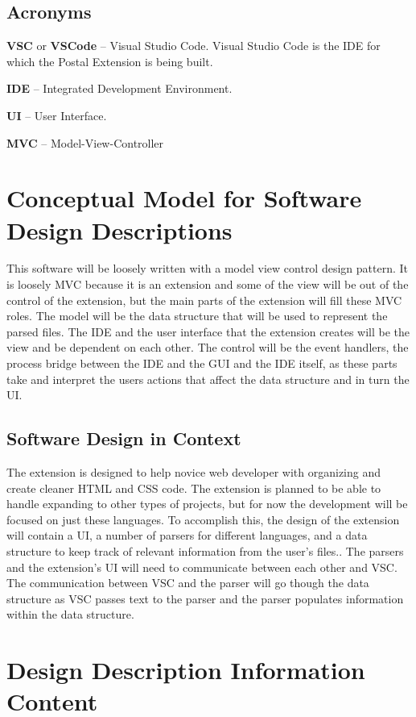 \documentclass[letterpaper,10pt,titlepage,draftclsnofoot,onecolumn,onesided] {IEEEtran}
\begin{document}
\subsection{Acronyms}
\textbf{VSC} or \textbf{VSCode} -- Visual Studio Code. Visual Studio Code is the IDE for which the Postal Extension is being built. 

\textbf{IDE} -- Integrated Development Environment. 

\textbf{UI} -- User Interface. 

\textbf{MVC} -- Model-View-Controller


\section{Conceptual Model for Software Design Descriptions}
This software will be loosely written with a model view control design pattern.
It is loosely MVC because it is an extension and some of the view will be out of the control of the extension, but the main parts of the extension will fill these MVC roles.
The model will be the data structure that will be used to represent the parsed files. 
The IDE and the user interface that the extension creates will be the view and be dependent on each other.
The control will be the event handlers, the process bridge between the IDE and the GUI and the IDE itself, as these parts take and interpret the users actions that affect the data structure and in turn the UI.

\subsection{Software Design in Context}
The extension is designed to help novice web developer with organizing and create cleaner HTML and CSS code. 
The extension is planned to be able to handle expanding to other types of projects, but for now the development will be focused on just these languages. 
To accomplish this, the design of the extension will contain a UI, a number of parsers for different languages, and a data structure to keep track of relevant information from the user's files..
The parsers and the extension's UI will need to communicate between each other and VSC.
The communication between VSC and the parser will go though the data structure as VSC passes text to the parser and the parser populates information within the data structure.

\section{Design Description Information Content}
\end{document}
